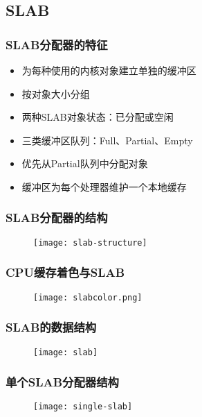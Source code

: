 \subsection{SLAB} %
\begin{frame}[plain,t]    
    \frametitle{SLAB分配器的特征}
    \begin{itemize}
        \item 为每种使用的内核对象建立单独的缓冲区
        \item 按对象大小分组
        \item 两种SLAB对象状态：已分配或空闲
        \item 三类缓冲区队列：Full、Partial、Empty
        \item 优先从Partial队列中分配对象
        \item 缓冲区为每个处理器维护一个本地缓存
    \end{itemize}
\end{frame}
\begin{frame}[plain,t]    
    \frametitle{SLAB分配器的结构}
    \begin{figure}
        \centering
        \texttt{[image: slab-structure]}
    \end{figure}
\end{frame}
\begin{frame}[plain,t]    
    \frametitle{CPU缓存着色与SLAB}
    \begin{figure}
        \centering
        \texttt{[image: slabcolor.png]}
    \end{figure}
\end{frame}
\begin{frame}[plain,t]    
    \frametitle{SLAB的数据结构}
    \begin{figure}
        \centering
        \texttt{[image: slab]}
    \end{figure}
\end{frame}
\begin{frame}[plain,t]    
    \frametitle{单个SLAB分配器结构}
    \begin{figure}
        \centering
        \texttt{[image: single-slab]}
    \end{figure}
\end{frame}
